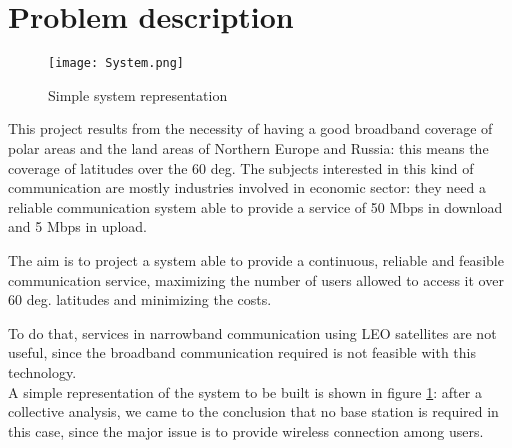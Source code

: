 \documentclass[11pt,a4paper,titlepage]{article}
\begin{document}
\section{Problem description}{

\begin{figure}[b]
	\centering
	\texttt{[image: System.png]}
	\caption{Simple system representation}
	\label{fig:system}
	\end{figure}

	This project results from the necessity of having a good broadband coverage of polar
	areas and the land areas of Northern Europe and Russia: this means the coverage of
	latitudes over the 60 deg. The subjects interested in this kind of communication are mostly
	industries involved in economic sector: they need a reliable communication system able to
	provide a service of 50 Mbps in download and 5 Mbps in upload.

	The aim is to project a system able to provide a continuous, reliable and feasible
	communication service, maximizing the number of users allowed to access it over 60 deg.
	latitudes and minimizing the costs.

	To do that, services in narrowband communication using LEO satellites are not useful,
	since the broadband communication required is not feasible with this technology.\\

	A simple representation of the system to be built is shown in figure \ref{fig:system}: after a collective analysis, we came to 	the conclusion that no base station is required in this case, since the major issue is to provide wireless connection 				among users.

}\label{sec:description}
\end{document}
